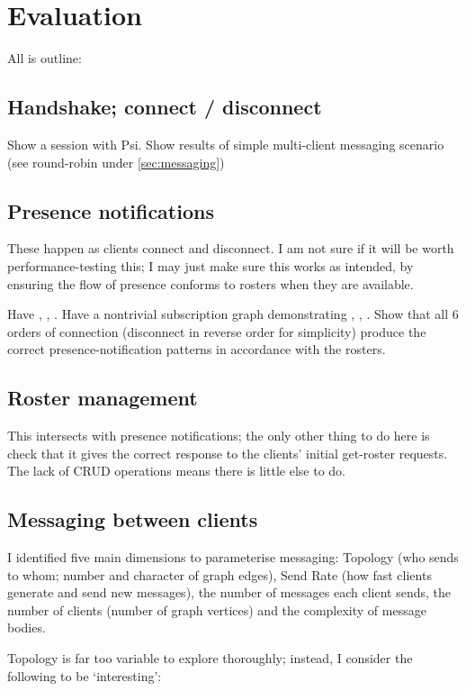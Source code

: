 \chapter{Evaluation}
All is outline:

\section{Handshake; connect / disconnect}
Show a session with Psi. Show results of simple multi-client messaging scenario (see round-robin under \ref{sec:messaging})

\section{Presence notifications}
These happen as clients connect and disconnect. I am not sure if it will be worth performance-testing this; I may just make sure this works as intended, by ensuring the flow of presence conforms to rosters when they are available.

Have , , . Have a nontrivial subscription graph demonstrating , , . Show that all 6 orders of connection (disconnect in reverse order for simplicity) produce the correct presence-notification patterns in accordance with the rosters.

\section{Roster management}
This intersects with presence notifications; the only other thing to do here is check that it gives the correct response to the clients' initial get-roster requests. The lack of CRUD operations means there is little else to do.

\section{Messaging between clients}
I identified five main dimensions to parameterise messaging: Topology (who sends to whom; number and character of graph edges), Send Rate (how fast clients generate and send new messages), the number of messages each client sends, the number of clients (number of graph vertices) and the complexity of message bodies.

Topology is far too variable to explore thoroughly; instead, I consider the following to be `interesting':


